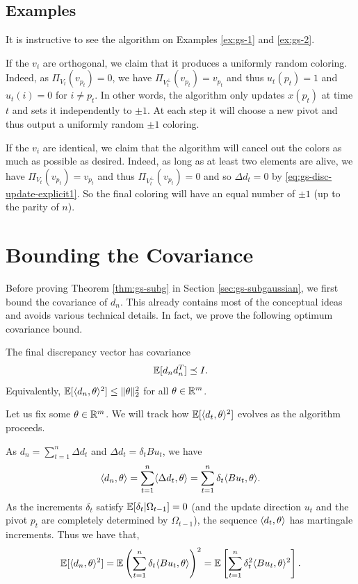 \subsection{Examples} It is instructive to see the algorithm on Examples \ref{ex:gs-1} and \ref{ex:gs-2}.

If the $v_i$ are orthogonal, we claim that it produces a uniformly random coloring.
Indeed, as $\Pi_{V_t} (v_{p_t})=0$, we have $\Pi_{V_t^\perp} (v_{p_t})=v_{p_t}$ and thus  $u_t(p_t)=1$ and $u_t(i)=0$ for $i\neq p_t$. In other words, the algorithm only updates $x(p_t)$ at time $t$ and sets it independently to $\pm 1$. At each step it will choose a new pivot and thus output a uniformly random $\pm 1$ coloring.

If the $v_i$ are identical, we claim that the algorithm will cancel out the colors as much as possible as desired. 
Indeed, as long as at least two elements are alive, we have $\Pi_{V_t}(v_{p_t}) = v_{p_t}$ and thus $\Pi_{V_t^\perp}(v_{p_t}) = 0$ and so $\Delta d_t=0$ by \eqref{eq:gs-disc-update-explicit1}. So the final coloring will have an equal number of $\pm 1$ (up to the parity of $n$).


\section{Bounding the Covariance}
\label{sec:gs-covariance}

Before proving Theorem \ref{thm:gs-subg} in Section \ref{sec:gs-subgaussian},
we first bound the covariance of $d_n$.
This already contains most of the conceptual ideas and avoids various technical details.
In fact, we prove the following optimum covariance bound. 
\begin{theorem}
\label{thm:gs-covariance}
 The final discrepancy vector has covariance \[\mathbb{E}[d_n d_n^T ] \preceq I.\]
Equivalently, $\mathbb{E}[\langle d_n,\theta\rangle^2] \leq \|\theta\|_2^2$ for all
$\theta \in \mathbb{R}^m$.
\end{theorem}

Let us fix some $\theta \in \mathbb{R}^m$.
We will track how $\mathbb{E}[\langle d_t,\theta\rangle^2]$ evolves as the algorithm proceeds.

As $d_n = \sum_{t=1}^n \Delta d_t$ and $\Delta d_t = \delta_t Bu_t$, we have
\[\langle d_n,\theta\rangle = \sum_{t=1}^n\langle  \Delta d_t,\theta\rangle = \sum_{t=1}^n \delta_t \langle Bu_t, \theta\rangle.\]
As the increments $\delta_t$ satisfy $\mathbb{E}[\delta_t|\Omega_{t-1}]=0$
(and the update direction $u_t$  and the pivot $p_t$ are completely
determined by $\Omega_{t-1}$), the sequence $ \langle d_t,\theta\rangle$ has martingale increments. Thus we have that,
\begin{equation}
\label{eq:gs-disc1}
\mathbb{E}[\langle d_n,\theta\rangle^2] = \mathbb{E} \left( \sum_{t=1}^n \delta_t   \langle Bu_t, \theta\rangle \right)^2 = \mathbb{E} \left[ \sum_{t=1}^n \delta_t^2   \langle Bu_t, \theta\rangle^2 \right].\end{equation}
